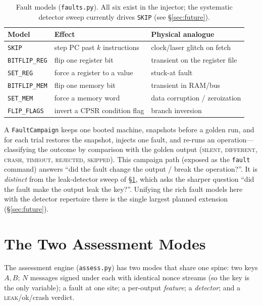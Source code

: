 \documentclass[11pt]{article}
\newcommand{\code}[1]{\texttt{#1}}
\begin{document}
\begin{table}[h]
\centering\small
\caption{Fault models (\code{faults.py}). All six exist in the injector; the
systematic detector sweep currently drives \code{SKIP} (see \S\ref{sec:future}).}
\label{tab:faults}
\begin{tabular}{@{}lll@{}}
\toprule
Model & Effect & Physical analogue \\
\midrule
\code{SKIP}        & step PC past $k$ instructions        & clock/laser glitch on fetch \\
\code{BITFLIP\_REG}& flip one register bit                & transient on the register file \\
\code{SET\_REG}    & force a register to a value          & stuck-at fault \\
\code{BITFLIP\_MEM}& flip one memory bit                  & transient in RAM/bus \\
\code{SET\_MEM}    & force a memory word                  & data corruption / zeroization \\
\code{FLIP\_FLAGS} & invert a CPSR condition flag         & branch inversion \\
\bottomrule
\end{tabular}
\end{table}

A \code{FaultCampaign} keeps one booted machine, snapshots before a golden run, and
for each trial restores the snapshot, injects one fault, and re-runs an
operation---classifying the outcome by comparison with the golden output
(\textsc{silent}, \textsc{different}, \textsc{crash}, \textsc{timeout},
\textsc{rejected}, \textsc{skipped}). This campaign path (exposed as the \code{fault}
command) answers ``did the fault change the output / break the operation?''. It is
\emph{distinct} from the leak-detector sweep of \S\ref{sec:modes}, which asks the
sharper question ``did the fault make the output leak the key?''. Unifying the rich
fault models here with the detector repertoire there is the single largest planned
extension (\S\ref{sec:future}).

\section{The Two Assessment Modes}\label{sec:modes}

The assessment engine (\code{assess.py}) has two modes that share one spine: two
keys $A,B$; $N$ messages signed under each with identical nonce streams (so the key
is the only variable); a fault at one site; a per-output \emph{feature}; a
\emph{detector}; and a \textsc{leak}/ok/crash verdict.
\end{document}

